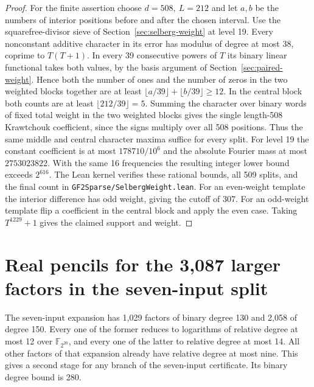 \documentclass[11pt]{article}
\begin{document}
\begin{proof}
For the finite assertion choose \(d=508,\ L=212\) and let \(a,b\)
be the numbers of interior positions before and after the chosen
interval. Use the squarefree-divisor sieve of
Section~\ref{sec:selberg-weight} at level 19. Every nonconstant
additive character in its error has modulus of degree at most 38,
coprime to \(T(T+1)\). In every 39 consecutive powers of \(T\) its
binary linear functional takes both values, by the basis argument
of Section~\ref{sec:paired-weight}. Hence both the number of ones
and the number of zeros in the two weighted blocks together are at
least \(\lfloor a/39\rfloor+\lfloor b/39\rfloor\ge12\). In the
central block both counts are at least \(\lfloor212/39\rfloor=5\).
Summing the character over binary words of fixed total weight in
the two weighted blocks gives the single length-508 Krawtchouk
coefficient, since the signs multiply over all 508 positions.
Thus the same middle and central character maxima suffice for
every split. For level 19 the constant coefficient is at most
\(178710/10^6\) and the absolute Fourier mass at most \(2753023822\).
With the same 16 frequencies the resulting integer lower bound
exceeds \(2^{616}\). The Lean kernel verifies these rational bounds,
all 509 splits, and the final count in
\nolinkurl{GF2Sparse/SelbergWeight.lean}. For an even-weight template
the interior difference has odd weight, giving the cutoff of 307.
For an odd-weight template flip a coefficient in the central block
and apply the even case. Taking \(T^{1229}+1\) gives the claimed
support and weight.
\end{proof}

\section{Real pencils for the 3,087 larger factors in the seven-input split}
\label{sec:elliptic-real-front}
The seven-input expansion has 1,029 factors of binary degree 130
and 2,058 of degree 150. Every one of the former reduces to
logarithms of relative degree at most 12 over \(\mathbb F_{2^{20}}\),
and every one of the latter to relative degree at most 14.
All other factors of that expansion already have relative degree
at most nine. This gives a second stage for any branch of the
seven-input certificate. Its binary degree bound is 280.
\end{document}
